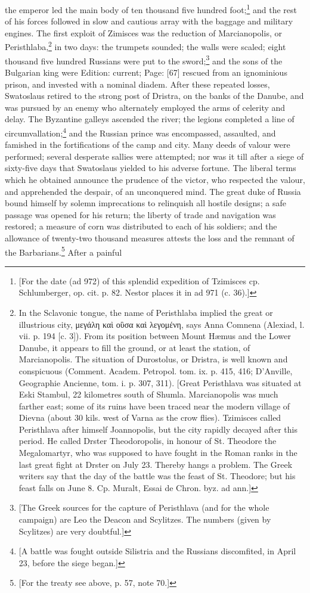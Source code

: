the emperor led the main body of ten thousand five hundred foot;\footnote{[For the date (ad 972) of this splendid expedition of Tzimisces cp. Schlumberger, op. cit. p. 82. Nestor places it in ad 971 (c. 36).]} and the rest of his forces followed in slow and cautious array with the baggage and military engines. The first exploit of Zimisces was the reduction of Marcianopolis, or Peristhlaba,\footnote{In the Sclavonic tongue, the name of Peristhlaba implied the great or illustrious city, \textgreek{μεγάλη κα\texthebrew{ὶ} ο\texthebrew{ὓ}σα κα\texthebrew{ὶ} λεγομένη}, says Anna Comnena (Alexiad, l. vii. p. 194 [c. 3]). From its position between Mount Hæmus and the Lower Danube, it appears to fill the ground, or at least the station, of Marcianopolis. The situation of Durostolus, or Dristra, is well known and conspicuous (Comment. Academ. Petropol. tom. ix. p. 415, 416; D\texthebrew{}’Anville, Geographie Ancienne, tom. i. p. 307, 311). [Great Peristhlava was situated at Eski Stambul, 22 kilometres south of Shumla. Marcianopolis was much farther east; some of its ruins have been traced near the modern village of Dievna (about 30 kils. west of Varna as the crow flies). Tzimisces called Peristhlava after himself Joannopolis, but the city rapidly decayed after this period. He called Drster Theodoropolis, in honour of St. Theodore the Megalomartyr, who was supposed to have fought in the Roman ranks in the last great fight at Drster on July 23. Thereby hangs a problem. The Greek writers say that the day of the battle was the feast of St. Theodore; but his feast falls on June 8. Cp. Muralt, Essai de Chron. byz. ad ann.]} in two days: the trumpets sounded; the walls were scaled; eight thousand five hundred Russians were put to the sword;\footnote{[The Greek sources for the capture of Peristhlava (and for the whole campaign) are Leo the Deacon and Scylitzes. The numbers (given by Scylitzes) are very doubtful.]} and the sons of the Bulgarian king were Edition: current; Page: [67] rescued from an ignominious prison, and invested with a nominal diadem. After these repeated losses, Swatoslaus retired to the strong post of Dristra, on the banks of the Danube, and was pursued by an enemy who alternately employed the arms of celerity and delay. The Byzantine galleys ascended the river; the legions completed a line of circumvallation;\footnote{[A battle was fought outside Silistria and the Russians discomfited, in April 23, before the siege began.]} and the Russian prince was encompassed, assaulted, and famished in the fortifications of the camp and city. Many deeds of valour were performed; several desperate sallies were attempted; nor was it till after a siege of sixty-five days that Swatoslaus yielded to his adverse fortune. The liberal terms which he obtained announce the prudence of the victor, who respected the valour, and apprehended the despair, of an unconquered mind. The great duke of Russia bound himself by solemn imprecations to relinquish all hostile designs; a safe passage was opened for his return; the liberty of trade and navigation was restored; a measure of corn was distributed to each of his soldiers; and the allowance of twenty-two thousand measures attests the loss and the remnant of the Barbarians.\footnote{[For the treaty see above, p. 57, note 70.]} After a painful 